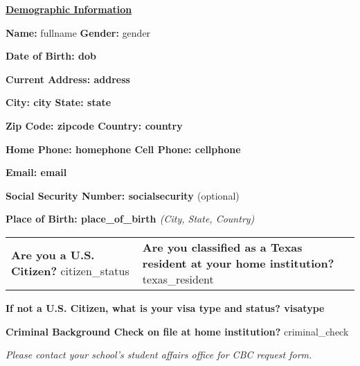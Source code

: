 \documentclass[10pt]{article}
\begin{document}
{\underline{\textbf{Demographic Information}}}
\begin{center}
    \textbf{\footnotesize Name:} {{ fullname }}
    \hrulefill 
    \hspace{1cm} 
    \textbf{\footnotesize Gender:} 
    {{ gender }}

\vspace{0.4cm}

\textbf{\footnotesize Date of Birth: {{ dob }}} \hrulefill  

\vspace{0.4cm}

\noindent\textbf{\footnotesize Current Address: {{ address }}} \hrulefill  

\vspace{0.4cm}

\noindent\textbf{\footnotesize City: {{ city }}} \hrulefill \quad \textbf{\footnotesize State: {{ state }}} \hrulefill  

\vspace{0.4cm}

\noindent\textbf{\footnotesize Zip Code: {{ zipcode }}} \hrulefill \quad \textbf{\footnotesize Country: {{ country }}} \hrulefill  

\vspace{0.4cm}

\noindent\textbf{\footnotesize Home Phone: {{ homephone }}} \hrulefill \quad \textbf{\footnotesize Cell Phone: {{ cellphone }}} \hrulefill  

\vspace{0.4cm}

\noindent\textbf{\footnotesize Email: {{ email }}} \hrulefill  

\vspace{0.4cm}

\noindent\textbf{\footnotesize Social Security Number: {{ socialsecurity }}} \hrulefill (\footnotesize optional)  

\vspace{0.4cm}

\noindent\textbf{\footnotesize Place of Birth: {{ place_of_birth }}} \hrulefill \quad \textit{(\footnotesize City, State, Country)}  

\begin{tabular}{p{8cm} p{8cm}}
    \textbf{\footnotesize Are you a U.S. Citizen?} {{ citizen_status }} &
    \textbf{\footnotesize Are you classified as a Texas resident at your home institution?} {{ texas_resident }}
\end{tabular} 

\vspace{0.4cm}

\noindent\textbf{\footnotesize If not a U.S. Citizen, what is your visa type and status? {{ visatype }}} \hrulefill  

\vspace{0.4cm}

\noindent\textbf{\footnotesize Criminal Background Check on file at home institution?} {{ criminal_check }}

\vspace{0.2cm}

\noindent\textit{\tiny Please contact your school’s student affairs office for CBC request form.}
\end{center}
\end{document}
